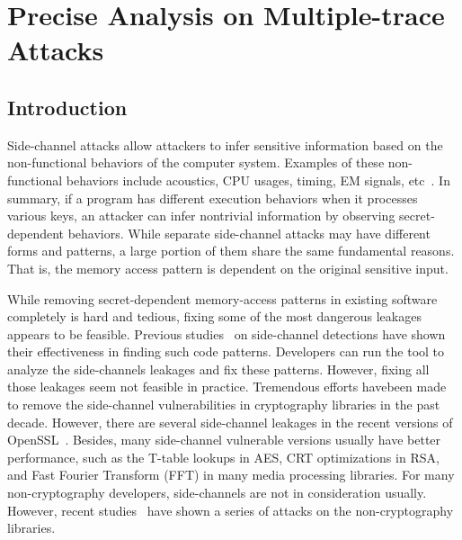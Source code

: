 
\chapter{Precise Analysis on Multiple-trace Attacks}\label{chapter5}
\section{Introduction}
Side-channel attacks allow attackers to infer sensitive information based on the non-functional behaviors of the computer system. Examples of these non-functional behaviors include acoustics, CPU usages, timing, EM signals, etc~\cite{agrawal2002side,hund2013practical,halevi2015keyboard,batina2019csi}. In summary, if a program has different execution behaviors when it processes various keys, an attacker can infer nontrivial information by observing secret-dependent behaviors. While separate side-channel attacks may have different forms and patterns, a large portion of them share the same fundamental reasons. That is, the memory access pattern is dependent on the original sensitive input.

While removing secret-dependent memory-access patterns in existing software completely is hard and tedious, fixing some of the most dangerous leakages appears to be feasible. Previous studies~\cite{182946,203878,182946,236338,217537,langley2010ctgrind,xiao2017stacco,wang2019time,Wichelmann:2018:MFF:3274694.3274741,bao2021abacus} on side-channel detections have shown their effectiveness in finding such code patterns. Developers can run the tool to analyze the side-channels leakages and fix these patterns. However, fixing all
those leakages seem not feasible in practice.  Tremendous efforts havebeen made to remove the side-channel vulnerabilities in cryptography
libraries in the past decade. However,  there are
several side-channel leakages in the recent versions of OpenSSL~\cite{OpenSSL-1.1.1-note}. Besides, many side-channel vulnerable versions usually
have better performance, such as the T-table lookups in AES, CRT
optimizations in RSA, and Fast Fourier Transform (FFT) in many media processing libraries. For many non-cryptography developers, side-channels are not in consideration usually. However, recent studies~\cite{xu2015controlled,191010,hahnel2017high} have shown a series of attacks on the non-cryptography libraries.


